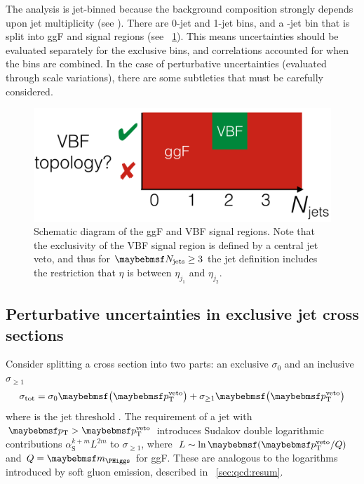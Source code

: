 
The analysis is jet-binned because the background composition strongly depends upon jet 
multiplicity (see \Figure{}). There are 0-jet and 1-jet bins, and a 
-jet bin that is split into \ac{ggF} and  signal regions (see 
\Figure~\ref{fig:sig:jetbinning}). This means uncertainties should be evaluated separately 
for the exclusive bins, and correlations accounted for when the bins are combined. In the 
case of perturbative uncertainties (evaluated through scale variations), there are some 
subtleties that must be carefully considered.

\begin{figure}
	\includegraphics[width=\mediumfigwidth]{tex/signal/signal_jetbins}
	\caption{Schematic diagram of the \ac{ggF} and \ac{VBF} signal regions. Note that the 
	exclusivity of the \ac{VBF} signal region is defined by a central jet veto, and thus 
	for $\njets \geq 3$ the jet definition includes the restriction that $\eta$ is between 
	$\eta_{j_1}$ and $\eta_{j_2}$.}
	\label{fig:sig:jetbinning}
\end{figure}



\subsection{Perturbative uncertainties in exclusive jet cross sections}

Consider splitting a cross section into two parts: an exclusive $\sigma_0$ and an 
inclusive $\sigma_{\geq1}$
\begin{equation}
	\sigma_{\total} = \sigma_0 \parenths{\ptveto} + \sigma_{\geq1} \parenths{\ptveto}
\end{equation}
where \ptveto is the jet \pt threshold \cite{YR2}. The requirement of a jet with 
$\pt > \ptveto$ introduces Sudakov double logarithmic contributions 
$\alpha_{\text{S}}^{k+m} L^{2m}$ to $\sigma_{\geq1}$, where 
$L \sim \ln\parenths{\ptveto/Q}$ and $Q = \mH$ for \ac{ggF}.
These are analogous to the logarithms introduced by soft gluon emission, described in 
\Section~\ref{sec:qcd:resum}. 

